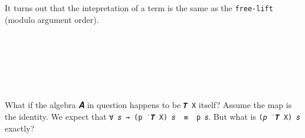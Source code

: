 It turns out that the intepretation of a term is the same as the
\texttt{free-lift} (modulo argument order).
\ccpad
\begin{code}%
\>[0][@{}l@{\AgdaIndent{1}}]%
\>[1]\AgdaSpace{}%
\AgdaSymbol{:}\AgdaSpace{}%
\AgdaSymbol{(}\AgdaSpace{}%
\AgdaSymbol{:}\AgdaSpace{}%
\AgdaSpace{}%
\AgdaSpace{}%
\AgdaSymbol{)(}\AgdaSpace{}%
\AgdaSymbol{:}\AgdaSpace{}%
\AgdaSpace{}%
\AgdaSpace{}%
\AgdaSpace{}%
\AgdaSpace{}%
\AgdaSymbol{)(}\AgdaSpace{}%
\AgdaSymbol{:}\AgdaSpace{}%
\AgdaSpace{}%
\AgdaSymbol{)}\<%
\\
\>[1][@{}l@{\AgdaIndent{0}}]%
\>[2]%
\>[20]\AgdaSymbol{(}\AgdaSpace{}%
\AgdaSpace{}%
\AgdaSymbol{)}\AgdaSpace{}%
\AgdaSpace{}%
\AgdaSpace{}%
\AgdaSymbol{(}\AgdaSpace{}%
\AgdaSpace{}%
\AgdaSymbol{)}\AgdaSpace{}%
\<%
\\
%
\\[\AgdaEmptyExtraSkip]%
%
\>[1]\AgdaSpace{}%
\AgdaSpace{}%
\AgdaSpace{}%
\AgdaSymbol{(}\AgdaSpace{}%
\AgdaSymbol{)}\AgdaSpace{}%
\AgdaSymbol{=}\AgdaSpace{}%
\<%
\\
%
\>[1]\AgdaSpace{}%
\AgdaSpace{}%
\AgdaSpace{}%
\AgdaSymbol{(}\AgdaSpace{}%
\AgdaSpace{}%
\AgdaSymbol{)}\AgdaSpace{}%
\AgdaSymbol{=}\AgdaSpace{}%
\AgdaSpace{}%
\AgdaSymbol{(}\AgdaSpace{}%
\AgdaSpace{}%
\AgdaSymbol{)}\AgdaSpace{}%
\AgdaSymbol{(}\AgdaSpace{}%
\AgdaSpace{}%
\AgdaSpace{}%
\AgdaSpace{}%
\AgdaSpace{}%
\AgdaSpace{}%
\AgdaSpace{}%
\AgdaSymbol{(}\AgdaSpace{}%
\AgdaSymbol{))}\<%
\\
\>[0]\<%
\end{code}

What if the algebra 𝑨 in question happens to be \texttt{𝑻\ X} itself?
Assume the map  is the identity. We
expect that \texttt{∀\ 𝑠\ →\ (p\ ̇\ 𝑻\ X)\ 𝑠\ \ ≡\ \ p\ 𝑠}. But what is
\texttt{(𝑝\ ̇\ 𝑻\ X)\ 𝑠} exactly?

